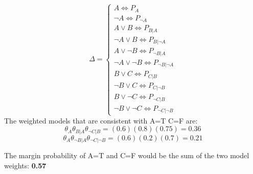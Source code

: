 \documentclass{article}
\begin{document}
 \section{}
 \[ \Delta = \begin{cases} 
      A \iff P_{A} \\
      \lnot A \iff P_{\lnot A} \\
      A \lor B \iff P_{B|A} \\
      \lnot A \lor B \iff P_{B|\lnot A} \\
      A \lor \lnot B \iff P_{\lnot B|A} \\
      \lnot A \lor \lnot B \iff P_{\lnot B|\lnot A} \\
      B \lor C \iff P_{C|B} \\
      \lnot B \lor C \iff P_{C|\lnot B} \\
      B \lor \lnot C \iff P_{\lnot C|B} \\
      \lnot B \lor \lnot C \iff P_{\lnot C|\lnot B}
   \end{cases}
\]
The weighted models that are consistent with A=T C=F are:
\[\theta_{A}\theta_{B|A}\theta_{\lnot C|B} = (0.6)(0.8)(0.75) = 0.36\]
\[\theta_{A}\theta_{\lnot B|A}\theta_{\lnot C|\lnot B} = (0.6)(0.2)(0.7) = 0.21\]

The margin probability of A=T and C=F would be the sum of the two model weights: \textbf{0.57}
 \clearpage
 \section{}

 
 \clearpage
 \section{}

\clearpage
\section{}

\clearpage
\section{}

\clearpage
\section{}
\end{document}
